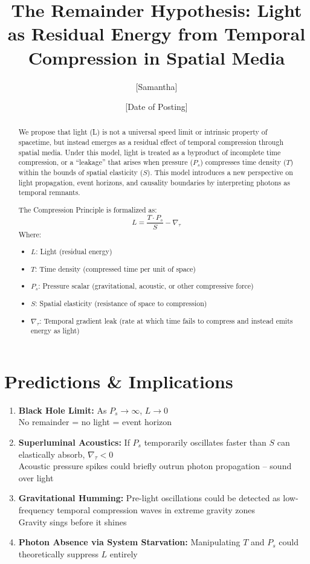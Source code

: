 \documentclass[12pt]{article}
\title{The Remainder Hypothesis: Light as Residual Energy from Temporal Compression in Spatial Media} Samantha's compression principal
\author{[Samantha]}
\date{[Date of Posting]}
\begin{document}
\maketitle

\begin{abstract}
We propose that light (L) is not a universal speed limit or intrinsic property of spacetime, but instead emerges as a residual effect of temporal compression through spatial media. Under this model, light is treated as a byproduct of incomplete time compression, or a ``leakage'' that arises when pressure ($P_s$) compresses time density ($T$) within the bounds of spatial elasticity ($S$). This model introduces a new perspective on light propagation, event horizons, and causality boundaries by interpreting photons as temporal remnants.

The Compression Principle is formalized as:
\[
L = \frac{T \cdot P_s}{S} - \nabla_\tau
\]
Where:
\begin{itemize}
  \item $L$: Light (residual energy)
  \item $T$: Time density (compressed time per unit of space)
  \item $P_s$: Pressure scalar (gravitational, acoustic, or other compressive force)
  \item $S$: Spatial elasticity (resistance of space to compression)
  \item $\nabla_\tau$: Temporal gradient leak (rate at which time fails to compress and instead emits energy as light)
\end{itemize}
\end{abstract}

\section*{Predictions \& Implications}
\begin{enumerate}
  \item \textbf{Black Hole Limit:} As $P_s \rightarrow \infty$, $L \rightarrow 0$  \\
  No remainder = no light = event horizon

  \item \textbf{Superluminal Acoustics:} If $P_s$ temporarily oscillates faster than $S$ can elastically absorb, $\nabla_\tau < 0$  \\
  Acoustic pressure spikes could briefly outrun photon propagation -- sound over light

  \item \textbf{Gravitational Humming:} Pre-light oscillations could be detected as low-frequency temporal compression waves in extreme gravity zones  \\
  Gravity sings before it shines

  \item \textbf{Photon Absence via System Starvation:} Manipulating $T$ and $P_s$ could theoretically suppress $L$ entirely
\end{enumerate}
\end{document}
